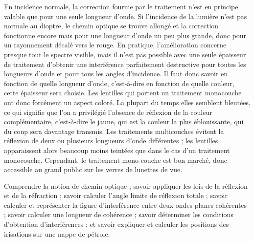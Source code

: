 \begin{remark}
  En incidence normale, la correction fournie par le traitement n'est en principe
  valable que pour une seule longueur d'onde. Si l'incidence de la lumière n'est
  pas normale au dioptre, le chemin optique se trouve allongé et la correction
  fonctionne encore mais pour une longueur d'onde un peu plus grande, donc pour un
  rayonnement décalé vers le rouge. En pratique, l'amélioration concerne presque
  tout le spectre visible, mais il n'est pas possible avec une seule épaisseur de
  traitement d'obtenir une interférence parfaitement destructive pour toutes les
  longueurs d'onde et pour tous les angles d'incidence. Il faut donc savoir en
  fonction de quelle longueur d'onde, c'est-à-dire en fonction de quelle couleur,
  cette épaisseur sera choisie. Les lentilles qui portent un traitement
  monocouche ont donc forcément un aspect coloré. La plupart du temps elles
  semblent bleutées, ce qui signifie que l'on a privilégié l'absence de réflexion
  de la couleur complémentaire, c'est-à-dire le jaune, qui est la couleur la plus
  éblouissante, qui du coup sera davantage transmis. Les traitements multicouches
  évitent la réflexion de deux ou plusieurs longueurs d'onde différentes ; les
  lentilles apparaissent alors beaucoup moins teintées que dans le cas d'un
  traitement monocouche. Cependant, le traitement mono-couche est bon marché, donc
  accessible au grand public sur les verres de lunettes de vue.
\end{remark}

\begin{conclusion}
  Comprendre la notion de chemin optique ; savoir appliquer les lois de la
  réflexion et de la réfraction ; savoir calculer l'angle limite de réflexion
  totale ; savoir calculer et représenter la figure d'interférence entre deux
  ondes planes cohérentes ; savoir calculer une longueur de cohérence ; savoir
  déterminer les conditions d'obtention d'interférences ; et savoir expliquer et
  calculer les positions des irisations sur une nappe de pétrole.
\end{conclusion}
